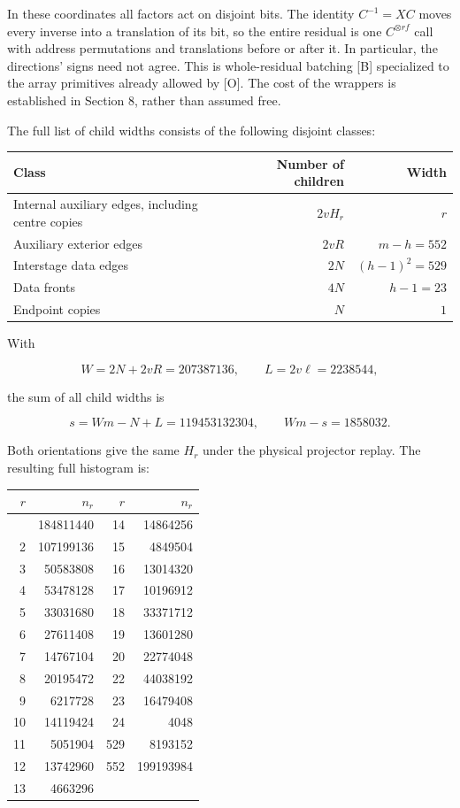 \documentclass[
  11pt,
]{article}
\newcounter{none} %
\begin{document}
In these coordinates all factors act on disjoint bits. The identity
\(C^{-1}=XC\) moves every inverse into a translation of its bit, so the
entire residual is one \(C^{\otimes rf}\) call with address permutations
and translations before or after it. In particular, the directions'
signs need not agree. This is whole-residual batching {[}B{]}
specialized to the array primitives already allowed by {[}O{]}. The cost
of the wrappers is established in Section 8, rather than assumed free.

The full list of child widths consists of the following disjoint
classes:


{\def\LTcaptype{none} %
\begin{longtable}[]{@{}lrr@{}}
\toprule\noalign{}
Class & Number of children & Width \\
\midrule\noalign{}
\endhead
\bottomrule\noalign{}
\endlastfoot
Internal auxiliary edges, including centre copies & \(2vH_r\) & \(r\) \\
Auxiliary exterior edges & \(2vR\) & \(m-h=552\) \\
Interstage data edges & \(2N\) & \((h-1)^2=529\) \\
Data fronts & \(4N\) & \(h-1=23\) \\
Endpoint copies & \(N\) & \(1\) \\
\end{longtable}
}

With

\[
 W=2N+2vR=207387136,\qquad L=2v\ell=2238544,
\]

the sum of all child widths is

\[
 s=Wm-N+L=119453132304,\qquad Wm-s=1858032.
 \tag{6.1}
\]

Both orientations give the same \(H_r\) under the physical projector
replay. The resulting full histogram is:


{\def\LTcaptype{none} %
\begin{longtable}[]{@{}rrrr@{}}
\toprule\noalign{}
\(r\) & \(n_r\) & \(r\) & \(n_r\) \\
\midrule\noalign{}
\endhead
\bottomrule\noalign{}
\endlastfoot
1 & 184811440 & 14 & 14864256 \\
2 & 107199136 & 15 & 4849504 \\
3 & 50583808 & 16 & 13014320 \\
4 & 53478128 & 17 & 10196912 \\
5 & 33031680 & 18 & 33371712 \\
6 & 27611408 & 19 & 13601280 \\
7 & 14767104 & 20 & 22774048 \\
8 & 20195472 & 22 & 44038192 \\
9 & 6217728 & 23 & 16479408 \\
10 & 14119424 & 24 & 4048 \\
11 & 5051904 & 529 & 8193152 \\
12 & 13742960 & 552 & 199193984 \\
13 & 4663296 & & \\
\end{longtable}
}
\end{document}
